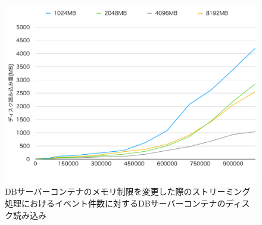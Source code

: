 \documentclass[../../../../../main]{subfiles}
\begin{document}
    \begin{figure}[H]
        \centering
        \includegraphics[width=12cm]{graph}
        \caption{DBサーバーコンテナのメモリ制限を変更した際のストリーミング処理におけるイベント件数に対するDBサーバーコンテナのディスク読み込み}
        \label{fig:stream-change-db-memory-limit-db-disk-out-app_4_8192-db_400}
    \end{figure}
\end{document}
